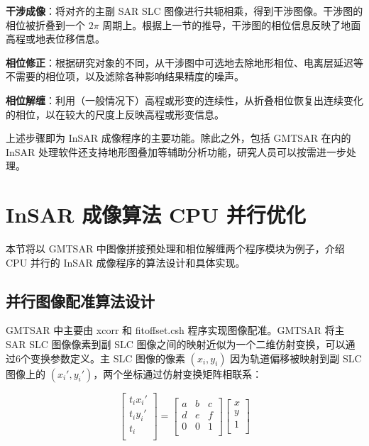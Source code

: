 \textbf{干涉成像}：将对齐的主副 SAR SLC 图像进行共轭相乘，得到干涉图像。干涉图的相位被折叠到一个 $2\pi$ 周期上。根据上一节的推导，干涉图的相位信息反映了地面高程或地表位移信息。

\textbf{相位修正}：根据研究对象的不同，从干涉图中可选地去除地形相位、电离层延迟等不需要的相位项，以及滤除各种影响结果精度的噪声。

\textbf{相位解缠}：利用（一般情况下）高程或形变的连续性，从折叠相位恢复出连续变化的相位，以在较大的尺度上反映高程或形变信息。

上述步骤即为 InSAR 成像程序的主要功能。除此之外，包括 GMTSAR 在内的 InSAR 处理软件还支持地形图叠加等辅助分析功能，研究人员可以按需进一步处理。

\section{InSAR 成像算法 CPU 并行优化}

本节将以 GMTSAR 中图像拼接预处理和相位解缠两个程序模块为例子，介绍 CPU 并行的 InSAR 成像程序的算法设计和具体实现。

\subsection{并行图像配准算法设计}

GMTSAR 中主要由 xcorr 和 fitoffset.csh 程序实现图像配准。GMTSAR 将主 SAR SLC 图像像素到副 SLC 图像之间的映射近似为一个二维仿射变换，可以通过6个变换参数定义。主 SLC 图像的像素 $(x_i, y_i)$ 因为轨道偏移被映射到副 SLC 图像上的 $(x_i', y_i')$，两个坐标通过仿射变换矩阵相联系：

\begin{equation}
\begin{bmatrix}
  t_i x_i' \\
  t_i y_i' \\
  t_i \\
\end{bmatrix}
= \begin{bmatrix}
       a & b & c \\
       d & e & f \\
       0 & 0 & 1 \\
\end{bmatrix}
\begin{bmatrix}
  x \\
  y \\
  1 \\
\end{bmatrix}
\end{equation}

